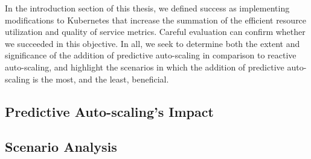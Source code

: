 In the introduction section of this thesis, we defined success as implementing
modifications to Kubernetes that increase the summation of the
efficient resource utilization and quality of service metrics. Careful
evaluation can confirm whether we succeeded in this objective. In all, we
seek to determine both the extent and significance of the addition of predictive
auto-scaling in comparison to reactive auto-scaling,
and highlight the scenarios in which the addition
of predictive auto-scaling is the most, and the least, beneficial.

\subsection{Predictive Auto-scaling's Impact}



\subsection{Scenario Analysis}


